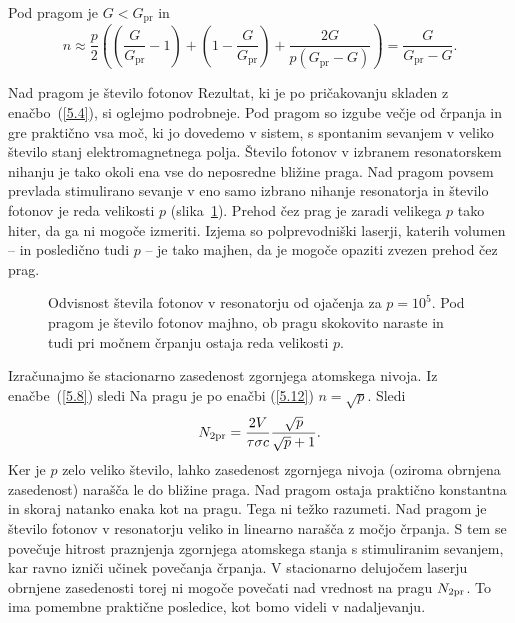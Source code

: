 Pod pragom je $G<G_\mathrm{pr}$ in 
\begin{equation}
n\approx \frac{p}{2}\left( \left(\frac{G}{G_\mathrm{pr}}-1\right)+\left(1
-\frac{G}{G_\mathrm{pr}}\right)+\frac{2G}{p(G_\mathrm{pr}-G)}\right) =\frac{G}{G_\mathrm{pr}-G}.
\label{5.13}
\end{equation}

Nad pragom je
število fotonov 
Rezultat, ki je po pričakovanju skladen z enačbo~(\ref{5.4}), si oglejmo podrobneje. 
Pod pragom so izgube večje od črpanja in gre praktično vsa moč, ki jo dovedemo v sistem, 
s spontanim sevanjem v veliko število stanj elektromagnetnega polja. 
Število fotonov v izbranem resonatorskem nihanju je tako okoli 
ena vse do neposredne bližine praga. Nad pragom povsem prevlada stimulirano sevanje 
v eno samo izbrano nihanje resonatorja in število fotonov je reda velikosti $p$ (slika~\ref{fig:p}).
Prehod čez prag je zaradi velikega $p$ tako hiter, da ga ni mogoče izmeriti.
Izjema so polprevodniški laserji, katerih 
volumen -- in posledično tudi $p$ -- 
je tako majhen, da je mogoče opaziti zvezen prehod čez prag.
\begin{figure}[h]
\centering
\def\svgwidth{50truemm} 

\caption{Odvisnost števila fotonov v resonatorju od ojačenja za $p=10^5$. 
Pod pragom je število fotonov majhno, ob pragu skokovito naraste in tudi 
pri močnem črpanju ostaja reda velikosti $p$.}
\label{fig:p}
\end{figure}

Izračunajmo še stacionarno zasedenost zgornjega atomskega nivoja. Iz 
enačbe~(\ref{5.8}) sledi
Na pragu je po enačbi (\ref{5.12}) $n=\sqrt{p}$. 
Sledi 
\begin{equation}  
N_{\rm 2pr}=\frac{2V}{\tau \sigma c}\frac{\sqrt{p}}{\sqrt{p}+1}.
\label{5.16}
\end{equation}
Ker je $p$ zelo veliko število, lahko zasedenost zgornjega
nivoja (oziroma obrnjena zasedenost) narašča le do bližine praga. Nad pragom ostaja praktično
konstantna in skoraj natanko enaka kot na pragu. Tega ni težko razumeti. Nad
pragom je število fotonov v resonatorju veliko in linearno narašča 
z močjo črpanja. S tem se povečuje hitrost praznjenja zgornjega atomskega 
stanja s stimuliranim sevanjem, kar ravno izniči učinek povečanja črpanja. 
V stacionarno delujočem laserju obrnjene zasedenosti torej ni mogoče povečati 
nad vrednost na pragu $N_{\rm 2pr}$. To ima pomembne praktične posledice, kot bomo
videli v nadaljevanju.

